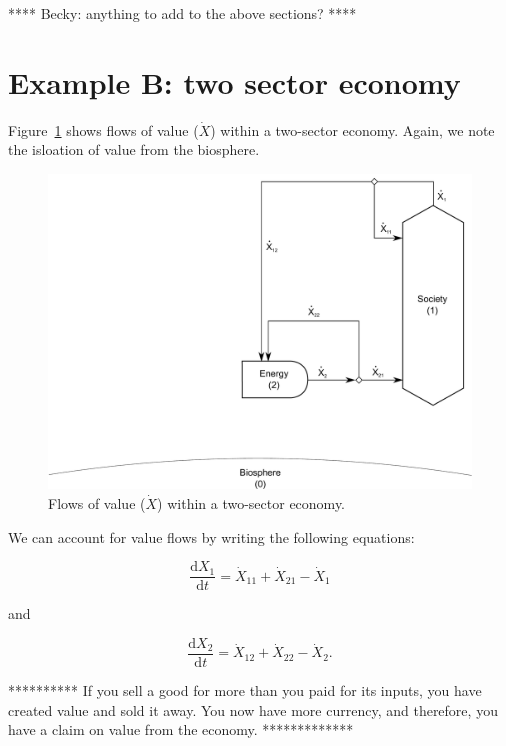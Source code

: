 **** Becky: anything to add to the above sections? ****


\section{Example B: two sector economy}

Figure~\ref{fig:B_value} shows flows of value ($\dot{X}$) 
within a two-sector economy. 
Again, we note the isloation of value from the biosphere.

\begin{figure}[h!]
\centering
\includegraphics[width=0.8\linewidth]{Part_3/Chapter_Values/images/2_sector_value.pdf}
\caption{Flows of value ($\dot{X}$) within a two-sector economy.}
\label{fig:B_value}
\end{figure}

We can account for value flows by writing
the following equations:

\begin{equation}
	\frac{\mathrm{d}X_{1}}{\mathrm{d}t}
	= \dot{X}_{11}
	+ \dot{X}_{21}
	- \dot{X}_{1}
\end{equation}

\noindent and

\begin{equation}
	\frac{\mathrm{d}X_{2}}{\mathrm{d}t}
	= \dot{X}_{12}
	+ \dot{X}_{22}
	- \dot{X}_{2}.
\end{equation}

**********
If you sell a good for more than you paid for its inputs, 
you have created value and sold it away. 
You now have more currency, and therefore, 
you have a claim on value from the economy.
*************




